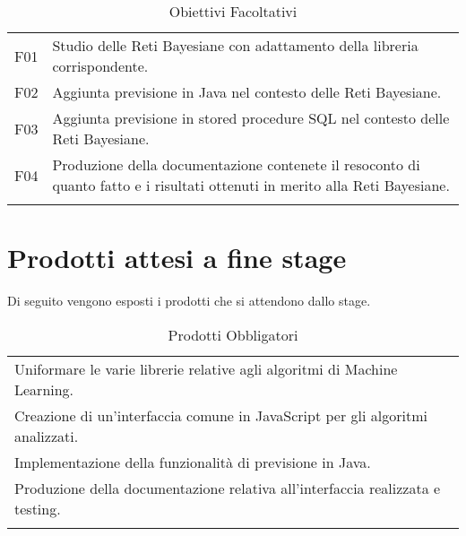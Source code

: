 {\renewcommand{\arraystretch}{2}
\begin{longtable}{|p{1cm}| p{12.25cm} |}
	\hline
	\rowcolor{blue} \multicolumn{2}{|c|}{
	{\textcolor{white}{Facoltativi}}
	} \\
		\endhead
		\hline \rowcolor{lightbrown}
		F01 & 
		Studio delle Reti Bayesiane con adattamento della libreria corrispondente.\\	
		\hline \rowcolor{lighterbrown}
		F02 & 
		Aggiunta previsione in Java nel contesto delle Reti Bayesiane. \\	
	\hline \rowcolor{lightbrown}
		F03 & 
		Aggiunta previsione in stored procedure SQL nel contesto delle Reti Bayesiane. \\	
	\hline \rowcolor{lighterbrown}
		F04 & 
	Produzione della documentazione contenete il resoconto di quanto fatto e i risultati ottenuti in merito alla Reti Bayesiane. \\
	\hline
	\caption{Obiettivi Facoltativi}\label{tab:fac-ob}
\end{longtable}}

\pagebreak

\section{Prodotti attesi a fine stage}
 Di seguito vengono esposti i prodotti che si attendono dallo stage.
{\renewcommand{\arraystretch}{2}
\begin{longtable}{|p{13.25cm}|}
	\hline
	\rowcolor{blue} \multicolumn{1}{|c|}{
	\textbf{\textcolor{white}{Obbligatori}}
	} \\
		\endhead
		\hline \rowcolor{lightbrown}
		 Uniformare le varie librerie relative agli algoritmi di Machine Learning.\\	
		\hline \rowcolor{lighterbrown}
		 Creazione di un'interfaccia comune in JavaScript per gli algoritmi analizzati.\\	
		\hline \rowcolor{lightbrown}
		 Implementazione della funzionalità di previsione in Java. \\	
	\hline \rowcolor{lighterbrown}
		Produzione della documentazione relativa all'interfaccia realizzata e testing. \\	
	\hline
	\caption{Prodotti Obbligatori}\label{tab:obb-prod}
\end{longtable}}


